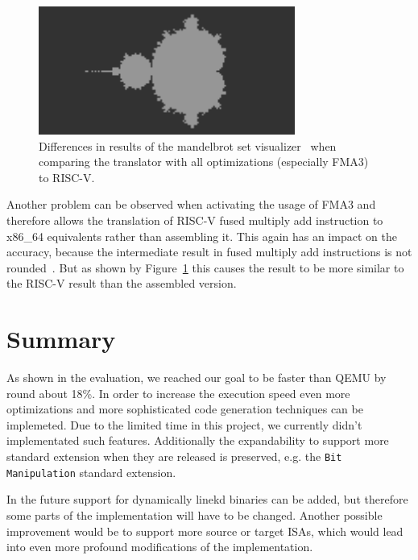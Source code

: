 \documentclass[course=eragp]{aspdoc}
\begin{document}
\par

\begin{figure}[H]
    \centering
    \includegraphics[width=0.75\textwidth]{images/mandelbrot_differences/fma_diff.png}
    \caption{Differences in results of the mandelbrot set visualizer~\cite{mandelbrot_program} when
        comparing the translator with all optimizations (especially FMA3) to RISC-V.}\label{fig:mandelbrot_diff_fma3}
\end{figure}

Another problem can be observed when activating the usage of FMA3 and therefore allows the
translation of RISC-V fused multiply add instruction to x86\_64 equivalents rather than assembling
it. This again has an impact on the accuracy, because the intermediate result in fused multiply add
instructions is not rounded~\cite{intel2017man}. But as shown by
Figure~\ref{fig:mandelbrot_diff_fma3} this causes the result to be more similar to the RISC-V result
than the assembled version.

\section{Summary}

As shown in the evaluation, we reached our goal to be faster than QEMU by round about 18\%. In order
to increase the execution speed even more optimizations and more sophisticated code generation
techniques can be implemeted. Due to the limited time in this project, we currently didn't
implementated such features. Additionally the expandability to support more standard extension when
they are released is preserved, e.g. the \texttt{Bit Manipulation} standard extension.

\par

In the future support for dynamically linekd binaries can be added, but therefore some parts of the
implementation will have to be changed. Another possible improvement would be to support more source
or target ISAs, which would lead into even more profound modifications of the implementation.
\end{document}
